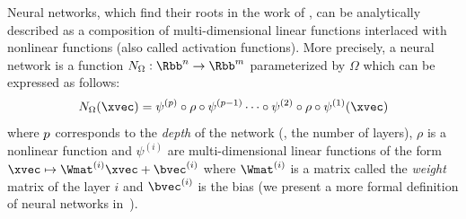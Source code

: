 Neural networks, which find their roots in the work of \citet{mcculloch1943logical,rosenblatt1958perceptron}, can be analytically described as a composition of multi-dimensional linear functions interlaced with nonlinear functions (also called activation functions).
More precisely, a neural network is a function $N_{\Omega} : \Rbb^n \rightarrow \Rbb^m$ parameterized by $\Omega$ which can be expressed as follows:
\begin{equation} \label{equation:ch1-neural_network}
  N_{\Omega}(\xvec) = \psi^{(\depth)} \circ \rho \circ \psi^{(\depth-1)} \cdots \circ \psi^{(2)} \circ \rho \circ \psi^{(1)} (\xvec)
\end{equation}
where $p$ corresponds to the \emph{depth} of the network (\ie, the number of layers), $\rho$ is a nonlinear function and $\psi^{(i)}$ are multi-dimensional linear functions of the form $\xvec \mapsto \Wmat^{(i)} \xvec + \bvec^{(i)}$ where $\Wmat^{(i)}$ is a matrix called the \emph{weight} matrix of the layer $i$ and $\bvec^{(i)}$ is the bias (we present a more formal definition of neural networks in~).


